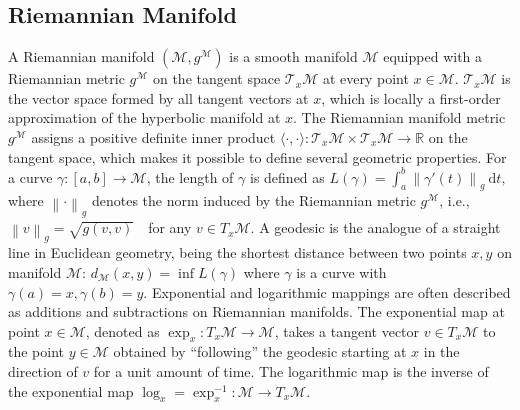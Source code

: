 \documentclass[letterpaper]{article} %
\begin{document}
\subsection{Riemannian Manifold}
A Riemannian manifold $(\mathcal{M},g^\mathcal{M})$ is a smooth manifold $\mathcal{M}$ equipped with a Riemannian metric $g^\mathcal{M}$ on the tangent space $\mathcal{T}_{x} \mathcal{M}$ at every point $x\in\mathcal{M}$.
$\mathcal{T}_{x} \mathcal{M}$ is the vector space formed by all tangent vectors at $x$, which is locally a first-order approximation of the hyperbolic manifold at $x$.
The Riemannian manifold metric $g^\mathcal{M}$ assigns a positive definite inner product $\langle\cdot,\cdot\rangle: \mathcal{T}_{x} \mathcal{M} \times \mathcal{T}_{x} \mathcal{M} \rightarrow \mathbb{R}$ on the tangent space, which makes it possible to define several geometric properties.
For a curve $\gamma:[a,b]\rightarrow \mathcal{M}$, the length of $\gamma$ is defined as $ L(\gamma)=\int_a^b \left\| \gamma'(t) \right \| _g\ \mathrm{d}t, $where $\left \| \cdot \right \|_g$ denotes the norm induced by the Riemannian metric $g^\mathcal{M}$, i.e., $ \left \| v \right \| _g=\sqrt{g(v,v)}\quad$for any $ v\in T_x\mathcal{M}$.
A geodesic is the analogue of a straight line in Euclidean geometry, being the shortest distance between two points $x,y$ on manifold $\mathcal{M}$: $d_\mathcal{M}(x,y)=\inf L(\gamma)$ where $\gamma$ is a curve with $\gamma(a)=x,\gamma(b)=y$.
Exponential and logarithmic mappings are often described as additions and subtractions on Riemannian manifolds.
The exponential map at point $x \in \mathcal{M}$, denoted as $\exp_x: T_x\mathcal{M}\rightarrow \mathcal{M}$, takes a tangent vector $v\in T_x\mathcal{M}$ to the point $y\in \mathcal{M}$ obtained by ``following'' the geodesic starting at $x$ in the direction of $v$ for a unit amount of time.
The logarithmic map is the inverse of the exponential map $\log_x=\exp_x^{-1}: \mathcal{M} \rightarrow T_x\mathcal{M}$.
\end{document}
